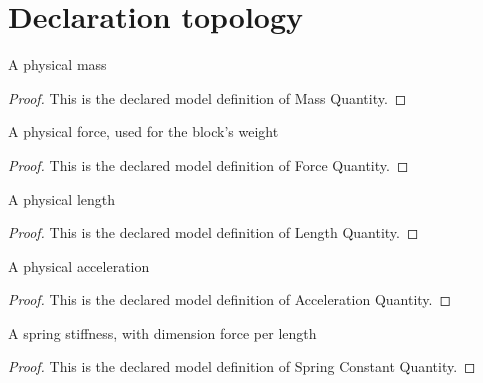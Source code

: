 \section{Declaration topology}
\begin{definition}
  \label{def:physics:phyx-mini-0257:phyxminiproblems-problemphyxmini0257-massquantity}
  A physical mass
\end{definition}
\begin{proof}
  This is the declared model definition of Mass Quantity.
\end{proof}
\begin{definition}
  \label{def:physics:phyx-mini-0257:phyxminiproblems-problemphyxmini0257-forcequantity}
  A physical force, used for the block's weight
\end{definition}
\begin{proof}
  This is the declared model definition of Force Quantity.
\end{proof}
\begin{definition}
  \label{def:physics:phyx-mini-0257:phyxminiproblems-problemphyxmini0257-lengthquantity}
  A physical length
\end{definition}
\begin{proof}
  This is the declared model definition of Length Quantity.
\end{proof}
\begin{definition}
  \label{def:physics:phyx-mini-0257:phyxminiproblems-problemphyxmini0257-accelerationquantity}
  A physical acceleration
\end{definition}
\begin{proof}
  This is the declared model definition of Acceleration Quantity.
\end{proof}
\begin{definition}
  \label{def:physics:phyx-mini-0257:phyxminiproblems-problemphyxmini0257-springconstantquantity}
  A spring stiffness, with dimension force per length
\end{definition}
\begin{proof}
  This is the declared model definition of Spring Constant Quantity.
\end{proof}
